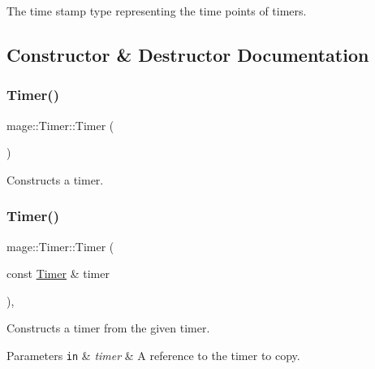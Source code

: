 The time stamp type representing the time points of timers. 

\subsection{Constructor \& Destructor Documentation}
\hypertarget{classmage_1_1_timer_ad529d2329ae911c8b4c64efd05a71dd0}{}\label{classmage_1_1_timer_ad529d2329ae911c8b4c64efd05a71dd0} 
\subsubsection{\texorpdfstring{Timer()}{Timer()}\hspace{0.1cm}{\footnotesize\ttfamily [1/3]}}
{\footnotesize\ttfamily mage\+::\+Timer\+::\+Timer (\begin{DoxyParamCaption}{ }\end{DoxyParamCaption})\hspace{0.3cm}{\ttfamily [noexcept]}}

Constructs a timer. \hypertarget{classmage_1_1_timer_ae792c5a546deb35e5e65ed7fe6a8d281}{}\label{classmage_1_1_timer_ae792c5a546deb35e5e65ed7fe6a8d281} 
\subsubsection{\texorpdfstring{Timer()}{Timer()}\hspace{0.1cm}{\footnotesize\ttfamily [2/3]}}
{\footnotesize\ttfamily mage\+::\+Timer\+::\+Timer (\begin{DoxyParamCaption}\item[{const \hyperlink{classmage_1_1_timer}{Timer} \&}]{timer }\end{DoxyParamCaption})\hspace{0.3cm}{\ttfamily [default]}, {\ttfamily [noexcept]}}

Constructs a timer from the given timer.


\begin{DoxyParams}[1]{Parameters}
\mbox{\tt in}  & {\em timer} & A reference to the timer to copy. \\
\hline
\end{DoxyParams}
\hypertarget{classmage_1_1_timer_a9fde919b6040a044748e98f59e18bece}{}\label{classmage_1_1_timer_a9fde919b6040a044748e98f59e18bece} 
